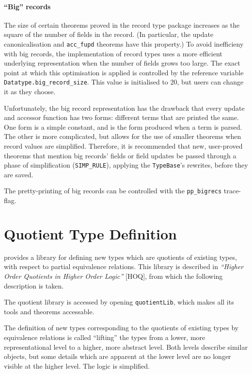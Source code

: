 \paragraph{``Big'' records} The size of certain theorems proved in the
record type package increases as the square of the number of fields in
the record.  (In particular, the update canonicalisation and
\texttt{acc\_fupd} theorems have this property.) To avoid inefficieny
with big records, the implementation of record types uses a more
efficient underlying representation when the number of fields grows
too large.  The exact point at which this optimisation is applied is
controlled by the reference variable
\texttt{Datatype.big\_record\_size}.  This value is initialised to 20,
but users can change it as they choose.

Unfortunately, the big record representation has the drawback that
every update and accessor function has two forms: different terms that
are printed the same.  One form is a simple constant, and is the form
produced when a term is parsed.  The other is more complicated, but
allows for the use of smaller theorems when record values are
simplified.  Therefore, it is recommended that new, user-proved
theorems that mention big records' fields or field updates be passed
through a phase of simplification (\texttt{SIMP\_RULE}), applying the
\texttt{TypeBase}'s rewrites, before they are saved.

The pretty-printing of big records can be controlled with the
\texttt{pp\_bigrecs} trace-flag.


\section{Quotient Type Definition}\label{quotients}

\HOL{} provides a library for defining new types which are quotients
of existing types, with respect to partial equivalence relations.
This library is described in {\it ``Higher Order Quotients in Higher
Order Logic''} [HOQ], from which the following description is taken.

The quotient library is accessed by opening {\tt quotientLib},
which makes all its tools and theorems accessable.

The definition of new types corresponding to the quotients of
existing types by equivalence relations is called ``lifting''
the types from a lower, more representational level to a higher,
more abstract level.  Both levels describe similar objects, but
some details which are apparent at the lower level are no longer
visible at the higher level.  The logic is simplified.

